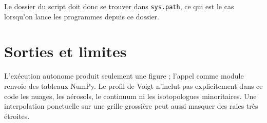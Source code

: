 \documentclass[11pt,a4paper]{article}
\begin{document}
Le dossier du script doit donc se trouver dans \texttt{sys.path}, ce qui est le
cas lorsqu'on lance les programmes depuis ce dossier.

\section{Sorties et limites}

L'exécution autonome produit seulement une figure ; l'appel comme module renvoie
des tableaux NumPy. Le profil de Voigt n'inclut pas explicitement dans ce code
les nuages, les aérosols, le continuum ni les isotopologues minoritaires. Une
interpolation ponctuelle sur une grille grossière peut aussi masquer des raies
très étroites.
\end{document}
